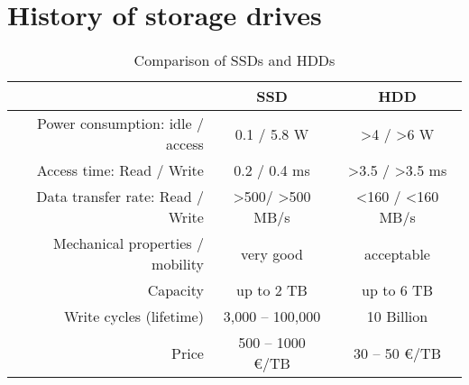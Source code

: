 \documentclass{acm_proc_article-sp}
\begin{document}
\section{History of storage drives}


\begin{table*}[bt]
\centering
\caption{Comparison of SSDs and HDDs}
\begin{tabular}{r|cc}
									& SSD						& HDD				\\ \hline \hline
Power consumption: idle / access		& 0.1 / 5.8 W				& >4 / >6 W			\\ \hline
Access time: Read / Write 			& 0.2 / 0.4 ms				& >3.5 / >3.5 ms	\\ \hline
Data transfer rate: Read / Write		& >500/ >500 MB/s			& <160 / <160 MB/s	\\ \hline
Mechanical properties / mobility		& very good					& acceptable		\\ \hline
Capacity							& up to 2 TB				& up to 6 TB		\\ \hline
Write cycles (lifetime)				& 3,000 -- 100,000			& 10 Billion		\\ \hline
Price								& 500 -- 1000 \euro/TB		& 30 -- 50 \euro/TB	\\
\end{tabular}
\end{table*}
\end{document}
